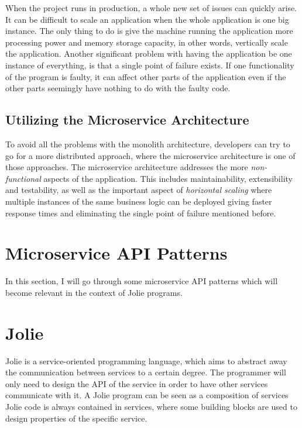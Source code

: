 When the project runs in production, a whole new set of issues can quickly arise. It can be difficult
to scale an application when the whole application is one big instance.
The only thing to do is give the machine running the application more processing power and memory 
storage capacity, in other words, vertically scale the application. Another significant problem with having the application be one instance of everything, is that a single point of failure exists. If one functionality of the program is faulty, it can affect other parts of the application
even if the other parts seemingly have nothing to do with the faulty code.

\subsection{Utilizing the Microservice Architecture}
To avoid all the problems with the monolith architecture, developers can try to go for a more
 distributed approach, where the microservice architecture is one of those approaches.
The microservice architecture addresses the more \textit{non-functional} aspects of the application.
This includes maintainability, extensibility and testability, as well as the important aspect of 
\textit{horizontal scaling} where multiple instances of the same business logic can be deployed giving 
faster response times and eliminating the single point of failure mentioned before.

\section{Microservice API Patterns}
In this section, I will go through some microservice API patterns which will become relevant in the context of Jolie programs.

\section{Jolie}
Jolie is a service-oriented programming language, which aims to abstract away the communication between services to a certain degree.
The programmer will only need to design the API of the service in order to have other services communicate with it.
A Jolie program can be seen as a composition of services
Jolie code is always contained in services, where some building blocks are used to design properties of the specific service.

